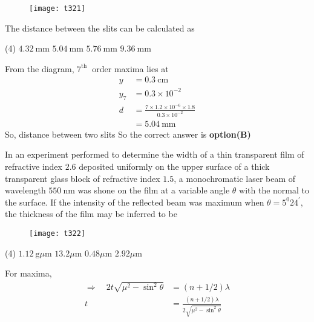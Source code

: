 \begin{questions}
\begin{minipage}{\textwidth}
	\begin{figure}[H]
		\centering
		\texttt{[image: t321]}
	\end{figure}
	The distance between the slits can be calculated as
\end{minipage}
\begin{tasks}(4)
	\task[\textbf{A.}]   $4.32 \mathrm{~mm}$
	\task[\textbf{B.}] $5.04 \mathrm{~mm}$
	\task[\textbf{C.}] $5.76 \mathrm{~mm}$
	\task[\textbf{D.}] $9.36 \mathrm{~mm}$
\end{tasks}
\begin{answer}
	From the diagram, $7^{\text {th }}$ order maxima lies at
	$$
	\begin{aligned}
	y &=0.3 \mathrm{~cm} \\
	y_{7} &=0.3 \times 10^{-2} \\
	d &=\frac{7 \times 1.2 \times 10^{-6} \times 1.8}{0.3 \times 10^{-2}} \\
	&=5.04 \mathrm{~mm}
	\end{aligned}
	$$
	So, distance between two slits
	So the correct answer is \textbf{option(B)}
\end{answer}
\begin{minipage}{\textwidth}
	\question In an experiment performed to determine the width of a thin transparent film of refractive index $2.6$ deposited uniformly on the upper surface of a thick transparent glass block of refractive index $1.5$, a monochromatic laser beam of wavelength $550 \mathrm{~nm}$ was shone on the film at a variable angle $\theta$ with the normal to the surface. If the intensity of the reflected beam was maximum when $\theta=5^{0} 24^{\prime}$, the thickness of the film may be inferred to be
\end{minipage}
\begin{figure}[H]
	\centering
	\texttt{[image: t322]}
\end{figure}
\begin{tasks}(4)
	\task[\textbf{A.}]   $1.12 \mathrm{~g} \mu \mathrm{m}$
	\task[\textbf{B.}] $13.2 \mu \mathrm{m}$
	\task[\textbf{C.}] $0.48 \mu \mathrm{m}$
	\task[\textbf{D.}] $2.92 \mu \mathrm{m}$
\end{tasks}
\begin{answer}
	For maxima,
	$$
	\begin{aligned}
	\Rightarrow \quad 2 t \sqrt{\mu^{2}-\sin ^{2} \theta} &=(n+1 / 2) \lambda \\
	t &=\frac{(n+1 / 2) \lambda}{2 \sqrt{\mu^{2}-\sin ^{2} \theta}} \\

\end{aligned}$$
\end{answer}
\end{questions}
